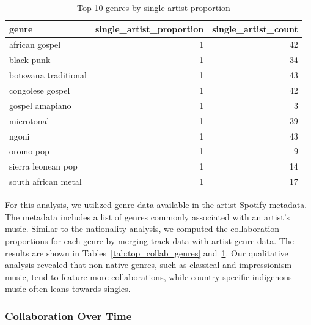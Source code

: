 \documentclass{article}
\begin{document}
\begin{table}[H]
    \centering
    \begin{tabular}[t]{lrr}
        \toprule
        genre                & single\_artist\_proportion & single\_artist\_count \\
        \midrule
        african gospel       & 1                          & 42                    \\
        black punk           & 1                          & 34                    \\
        botswana traditional & 1                          & 43                    \\
        congolese gospel     & 1                          & 42                    \\
        gospel amapiano      & 1                          & 3                     \\
        microtonal           & 1                          & 39                    \\
        ngoni                & 1                          & 43                    \\
        oromo pop            & 1                          & 9                     \\
        sierra leonean pop   & 1                          & 14                    \\
        south african metal  & 1                          & 17                    \\
        \bottomrule
    \end{tabular}
    \caption{Top 10 genres by single-artist proportion}\label{tab:top_single_genres}
\end{table}

For this analysis, we utilized genre data available in the artist Spotify
metadata. The metadata includes a list of genres commonly associated with an
artist's music. Similar to the nationality analysis, we computed the
collaboration proportions for each genre by merging track data with artist
genre data. The results are shown in Tables\ \ref{tab:top_collab_genres} and\
\ref{tab:top_single_genres}. Our qualitative analysis revealed that non-native
genres, such as classical and impressionism music, tend to feature more
collaborations, while country-specific indigenous music often leans towards
singles.

\subsubsection{Collaboration Over Time}
\end{document}
